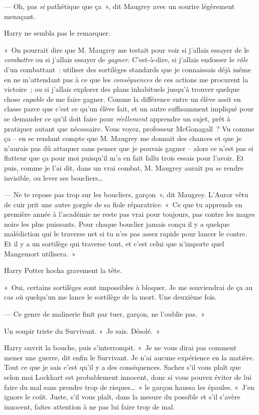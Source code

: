 --- Oh, pas \emph{si} pathétique que ça~», dit Maugrey avec un sourire légèrement menaçant.

Harry ne sembla pas le remarquer.

«~On pourrait dire que M. Maugrey me testait pour voir si j'allais essayer de le \emph{combattre} ou si j'allais essayer de \emph{gagner}.
C'est-à-dire, si j'allais endosser le \emph{rôle} d'un combattant~: utiliser des sortilèges standards que je connaissais déjà même en ne m'attendant pas à ce que les \emph{conséquences} de ces actions me procurent la victoire~; ou si j'allais explorer des plans inhabituels jusqu'à trouver quelque chose \emph{capable} de me faire gagner.
Comme la différence entre un élève assit en classe parce que c'est ce qu'un élève fait, et un autre suffisamment impliqué pour se demander ce qu'il doit faire pour \emph{réellement} apprendre un sujet, prêt à pratiquer autant que nécessaire.
Vous voyez, professeur McGonagall~?
Vu comme ça -- en se rendant compte que M. Maugrey me donnait des chances et que je n'aurais pas dû attaquer sans penser que je pouvais gagner -- alors ce n'est pas si flatteur que ça pour moi puisqu'il m'a en fait fallu trois essais pour l'avoir.
Et puis, comme je l'ai dit, dans un vrai combat, M. Maugrey aurait pu \emph{se} rendre invisible, ou lever ses boucliers…

--- Ne te repose pas trop sur les boucliers, garçon~», dit Maugrey.
L'Auror vêtu de cuir prit une autre gorgée de sa fiole réparatrice.
«~Ce que tu apprends en première année à l'académie ne reste pas vrai pour toujours, pas contre les mages noirs les plus puissants.
Pour chaque bouclier jamais conçu il y a quelque malédiction qui le traverse net si tu n'es pas assez rapide pour lancer le contre.
Et il y a un sortilège qui traverse tout, et c'est celui que n'importe quel Mangemort utilisera.~»

Harry Potter hocha gravement la tête.

«~Oui, certains sortilèges sont impossibles à bloquer.
Je me souviendrai de ça au cas où quelqu'un me lance le sortilège de la mort.
Une deuxième fois.

--- Ce genre de malinerie finit par tuer, garçon, ne l'oublie pas.~»

Un soupir triste du Survivant.
«~Je sais.
Désolé.~»

Harry ouvrit la bouche, puis s'interrompit.
«~Je ne vous dirai pas comment mener une guerre, dit enfin le Survivant.
Je n'ai aucune expérience en la matière.
Tout ce que je sais c'est qu'il y a des conséquences.
Sachez s'il vous plaît que selon moi Lockhart est probablement innocent, donc si vous pouvez éviter de lui faire du mal sans prendre trop de risques…~»
le garçon haussa les épaules.
«~J'en ignore le coût.
Juste, s'il vous plaît, dans la mesure du possible et s'il s'avère innocent, faites attention à ne pas lui faire trop de mal.

